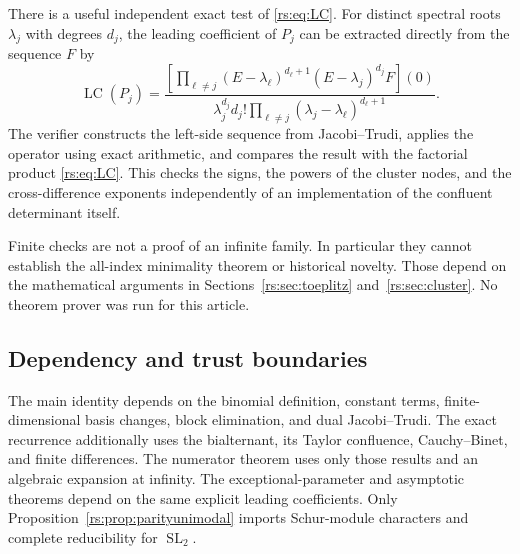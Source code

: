 \documentclass[11pt]{article}
\theoremstyle{definition}
\theoremstyle{remark}
\newcommand{\SL}{\operatorname{SL}}
\newcommand{\LC}{\operatorname{LC}}
\newcommand{\QQ}{\mathscr Q}
\theoremstyle{definition}
\theoremstyle{plain}
\numberwithin{equation}{section}
\begin{document}
\noindent[Added 29 September 2026, batch 56: in this report the verifier
is shipped as \path{code/02-schur-recurrences-verify.py} and its records as
\path{data/02-schur-recurrences-verification.json},
\path{data/02-schur-recurrences-verification.log} and
\path{data/02-schur-recurrences-sample_polynomials.json};
\path{code/verify.py} and \path{data/verification.json} are Part~I's files
(Section~\ref{sec:verify}). Run the verifier with an explicit
\texttt{--output} outside \path{data/}: by default it writes
\path{data/verification.json}, and it always writes
\path{sample_polynomials.json} next to its output, so a run without
\texttt{--output} would overwrite Part~I's records. A rerun on a copy on
29 September 2026 (Python 3.13.5, SymPy 1.14.0) passed every check and
reproduced the recorded files up to line endings (the script writes CRLF on
Windows) and the field \texttt{elapsed\_seconds}. For the exceptional
parameters the recorded run checks that the denominators of
Theorem~\ref{rs:thm:real} annihilate the sequences; their minimality is
proved in the text, and an independent Berlekamp--Massey computation during
the intake found exactly those minimal denominators for $k\le10$ at
$t=0,\pm1$, and exactly $\QQ_k$ for $k\le9$ at $t=2,3,-2,1/2$.]


There is a useful independent exact test of \eqref{rs:eq:LC}. For distinct
spectral roots $\lambda_j$ with degrees $d_j$, the leading coefficient of
$P_j$ can be extracted directly from the sequence $F$ by
\begin{equation}
 \LC(P_j)=
 \frac{\left[\displaystyle\prod_{\ell\ne j}(E-\lambda_\ell)^{d_\ell+1}
 (E-\lambda_j)^{d_j}F\right](0)}
 {\lambda_j^{d_j}d_j!\displaystyle\prod_{\ell\ne j}
 (\lambda_j-\lambda_\ell)^{d_\ell+1}}.
 \label{rs:eq:projection-check}
\end{equation}
The verifier constructs the left-side sequence from Jacobi--Trudi, applies
the operator using exact arithmetic, and compares the result with the
factorial product \eqref{rs:eq:LC}. This checks the signs, the powers of the
cluster nodes, and the cross-difference exponents independently of an
implementation of the confluent determinant itself.

Finite checks are not a proof of an infinite family. In particular they
cannot establish the all-index minimality theorem or historical novelty.
Those depend on the mathematical arguments in Sections~\ref{rs:sec:toeplitz}
and~\ref{rs:sec:cluster}. No theorem prover was run for this article.

\subsection{Dependency and trust boundaries}
The main identity depends on the binomial definition, constant terms,
finite-dimensional basis changes, block elimination, and dual Jacobi--Trudi.
The exact recurrence additionally uses the bialternant, its Taylor confluence,
Cauchy--Binet, and finite differences. The numerator theorem uses only those
results and an algebraic expansion at infinity. The exceptional-parameter
and asymptotic theorems depend on the same explicit leading coefficients.
Only Proposition~\ref{rs:prop:parityunimodal} imports Schur-module characters
and complete reducibility for $\SL_2$.
\end{document}

